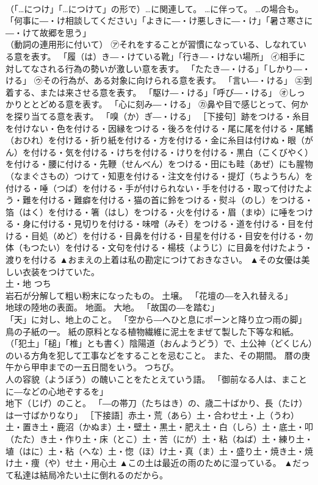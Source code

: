 \documentclass[8pt]{extreport}
\begin{document}
\begin{CJK}{UTF8}{min}
\\	（「…につけ」「…につけて」の形で）…に関連して。 …に伴って。 …の場合も。 「何事に―・け相談してください」「よきに―・け悪しきに―・け」「暑さ寒さに―・けて故郷を思う」 
\\	（動詞の連用形に付いて） ㋐それをすることが習慣になっている、しなれている意を表す。 「履（は）き―・けている靴」「行き―・けない場所」 ㋑相手に対してなされる行為の勢いが激しい意を表す。 「たたき―・ける」「しかり―・ける」 ㋒その行為が、ある対象に向けられる意を表す。 「言い―・ける」 ㋓到着する、または来させる意を表す。 「駆け―・ける」「呼び―・ける」 ㋔しっかりととどめる意を表す。 「心に刻み―・ける」 ㋕鼻や目で感じとって、何かを探り当てる意を表す。 「嗅（か）ぎ―・ける」 ［下接句］跡をつける・糸目を付けない・色を付ける・因縁をつける・後ろを付ける・尾に尾を付ける・尾鰭（おひれ）を付ける・折り紙を付ける・方を付ける・金に糸目は付けぬ・眼（がん）を付ける・気を付ける・けちを付ける・けりを付ける・黒白（こくびやく）を付ける・腰に付ける・先鞭（せんべん）をつける・田にも畦（あぜ）にも腥物（なまぐさもの）つけて・知恵を付ける・注文を付ける・提灯（ちようちん）を付ける・唾（つば）を付ける・手が付けられない・手を付ける・取って付けたよう・難を付ける・難癖を付ける・猫の首に鈴をつける・熨斗（のし）をつける・箔（はく）を付ける・箸（はし）をつける・火を付ける・眉（まゆ）に唾をつける・身に付ける・見切りを付ける・味噌（みそ）をつける・道を付ける・目を付ける・目処（めど）を付ける・目鼻を付ける・目星を付ける・目安を付ける・勿体（もつたい）を付ける・文句を付ける・楊枝（ようじ）に目鼻を付けたよう・渡りを付ける	▲おまえの上着は私の勘定につけておきなさい。 ▲その女優は美しい衣装をつけていた。
\\	土・地	つち	
\\	岩石が分解して粗い粉末になったもの。 土壌。 「花壇の―を入れ替える」 
\\	地球の陸地の表面。 地面。 大地。 「故国の―を踏む」 
\\	「天」に対し、地上のこと。 「空から―へひと息にポーンと降り立つ雨の脚」 
\\	鳥の子紙の一。 紙の原料となる植物繊維に泥土をまぜて製した下等な和紙。 
\\	（「犯土」「槌」「椎」とも書く）陰陽道（おんようどう）で、土公神（どくじん）のいる方角を犯して工事などをすることを忌むこと。 また、その期間。 暦の庚午から甲申までの一五日間をいう。 つちび。 
\\	人の容貌（ようぼう）の醜いことをたとえていう語。 「御前なる人は、まことに―などの心地ぞするを」 
\\	地下（じげ）のこと。 「―の帯刀（たちはき）の、歳二十ばかり、長（たけ）は一寸ばかりなり」 ［下接語］赤土・荒（あら）土・合わせ土・上（うわ）土・置き土・鹿沼（かぬま）土・壁土・黒土・肥え土・白（しら）土・底土・叩（たた）き土・作り土・床（とこ）土・苦（にが）土・粘（ねば）土・練り土・埴（はに）土・粘（へな）土・惚（ほ）け土・真（ま）土・盛り土・焼き土・焼け土・痩（や）せ土・用心土	▲この土は最近の雨のために湿っている。 ▲だって私達は結局冷たい土に倒れるのだから。

\end{CJK}
\end{document}
